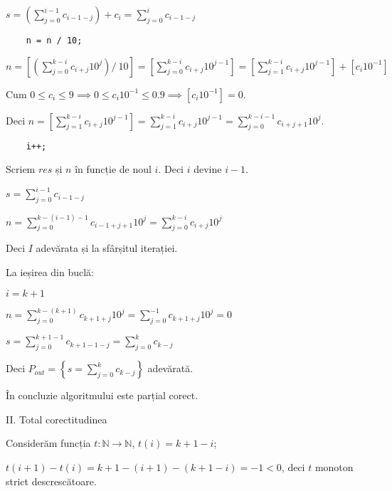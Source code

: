 \documentclass[11pt]{article}
\begin{document}
$s = \left( \sum\limits_{j=0}^{i-1}c_{i-1-j} \right) + c_{i}
= \sum\limits_{j=0}^{i}c_{i-1-j}
$

\begin{verbatim}
    n = n / 10;
\end{verbatim}

$n = \left[ \left( \sum\limits_{j=0}^{k-i}c_{i+j}10^{j} \right) / \ 10 \right]
= \left[ \sum\limits_{j=0}^{k-i}c_{i+j}10^{j-1} \right]
= \left[ \sum\limits_{j=1}^{k-i}c_{i+j}10^{j-1} \right] + \left[c_{i}10^{-1} \right]
$

Cum $0 \le c_{i} \le 9 \implies 0 \le c_{i}10^{-1} \le 0.9 \implies \left[c_{i}10^{-1} \right] = 0$.

Deci $n = \left[ \sum\limits_{j=1}^{k-i}c_{i+j}10^{j-1} \right] = \sum\limits_{j=1}^{k-i}c_{i+j}10^{j-1} = \sum\limits_{j=0}^{k-i-1}c_{i+j+1}10^{j}$. 

\begin{verbatim}
    i++;
\end{verbatim}

Scriem $\mathit{res}$ și $n$ în funcție de noul $i$. Deci $i$ devine $i-1$.


$s = \sum\limits_{j=0}^{i-1}c_{i-1-j}$

$n = \sum\limits_{j=0}^{k-(i-1)-1}c_{i-1+j+1}10^{j} = \sum\limits_{j=0}^{k-i}c_{i+j}10^{j} $

Deci $I$ adevărata și la sfârșitul iterației.


\vspace{14pt}
La ieșirea din buclă:

$i = k + 1$

$n = \sum\limits_{j=0}^{k-(k+1)}c_{k+1+j}10^{j}
= \sum\limits_{j=0}^{-1}c_{k+1+j}10^{j} = 0$

$s = \sum\limits_{j=0}^{k+1-1}c_{k+1-1-j}
= \sum\limits_{j=0}^{k}c_{k-j}$

Deci $P_{out} = \left\{ s = \sum\limits_{j=0}^{k} c_{k-j} \right\} $ adevărată.

În concluzie algoritmului este parțial corect.

\vspace{14pt}
\noindent
II. Total corectitudinea
\newline

Considerăm funcția $t: \mathbb{N} \to \mathbb{N}$, $t(i) = k + 1 - i$;

$t(i + 1) - t(i) = k + 1 - (i + 1) - (k + 1 - i) = -1 < 0$, deci $t$ monoton strict descrescătoare.
\end{document}
